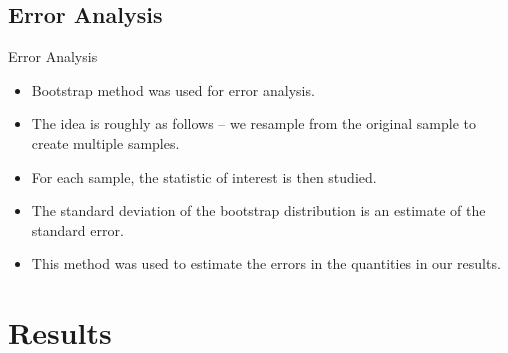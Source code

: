 \documentclass{beamer}
\begin{document}
\subsection{Error Analysis}
\begin{frame}{Error Analysis}
\begin{itemize}
    \item Bootstrap method was used for error analysis.
    \item The idea is roughly as follows – we resample from the original sample to create multiple samples.
    \item For each sample, the statistic of interest is then studied.
    \item The standard deviation of the bootstrap distribution is an estimate of the standard error.
    \item This method was used to estimate the errors in the quantities in our results.
\end{itemize}
\end{frame}

\section{Results}
\end{document}
